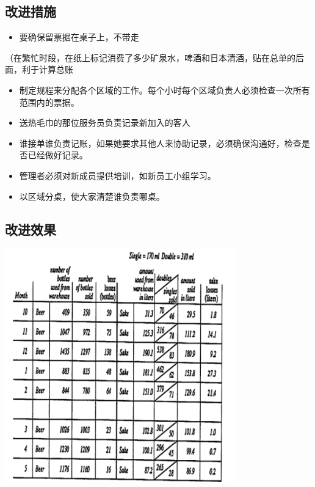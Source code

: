 \hypertarget{ux6539ux8fdbux63aaux65bd}{%
\subsection{改进措施}\label{ux6539ux8fdbux63aaux65bd}}

\begin{itemize}
\tightlist
\item
  要确保留票据在桌子上，不带走
\end{itemize}

（在繁忙时段，在纸上标记消费了多少矿泉水，啤酒和日本清酒，贴在总单的后面，利于计算总账

\begin{itemize}
\tightlist
\item
  制定规程来分配各个区域的工作。每个小时每个区域负责人必须检查一次所有范围内的票据。
\end{itemize}

\begin{itemize}
\tightlist
\item
  送热毛巾的那位服务员负责记录新加入的客人
\end{itemize}

\begin{itemize}
\tightlist
\item
  谁接单谁负责记账，如果她要求其他人来协助记录，必须确保沟通好，检查是否已经做好记录。
\end{itemize}

\begin{itemize}
\tightlist
\item
  管理者必须对新成员提供培训，如新员工小组学习。
\end{itemize}

\begin{itemize}
\tightlist
\item
  以区域分桌，使大家清楚谁负责哪桌。
\end{itemize}

\hypertarget{ux6539ux8fdbux6548ux679c}{%
\subsection{改进效果}\label{ux6539ux8fdbux6548ux679c}}


\includegraphics[width=10cm]{club19.png}

